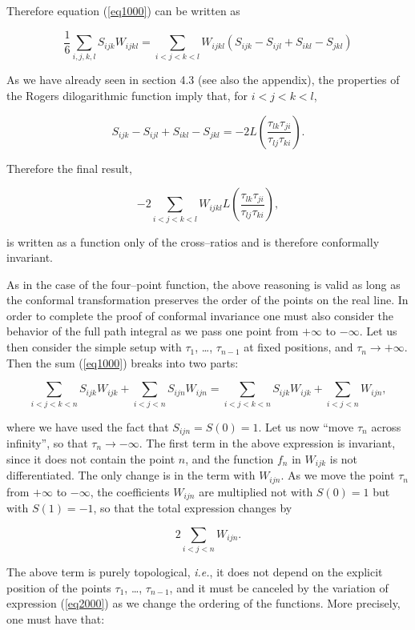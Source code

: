 \documentclass[a4paper,11pt]{article}
\begin{document}
\noindent
Therefore equation (\ref{eq1000}) can be written as 

$$
\frac{1}{6}\sum_{i,j,k,l}S_{ijk}W_{ijkl}=\sum_{i<j<k<l}W_{ijkl}\left(
S_{ijk}-S_{ijl}+S_{ikl}-S_{jkl}\right)
$$

\noindent
As we have already seen in section 4.3 (see also the appendix), the 
properties of the Rogers dilogarithmic function imply that, for $i<j<k<l$, 

$$
S_{ijk}-S_{ijl}+S_{ikl}-S_{jkl}=-2L\left( \frac{\tau _{lk}\tau _{ji}}{\tau
_{lj}\tau _{ki}}\right) .
$$

\noindent
Therefore the final result,

\begin{equation}
-2\sum_{i<j<k<l}W_{ijkl}L\left( \frac{\tau _{lk}\tau _{ji}}{\tau _{lj}\tau
_{ki}}\right) ,
\end{equation}

\noindent
is written as a function only of the cross--ratios and is therefore
conformally invariant.

As in the case of the four--point function, the above reasoning is valid as
long as the conformal transformation preserves the order of the points on
the real line. In order to complete the proof of conformal invariance 
one must also consider the behavior of the full path integral as we pass
one point from $+\infty$ to $-\infty$. Let us then consider the simple
setup with $\tau_{1}$, \dots, $\tau_{n-1}$ at fixed positions, and $\tau
_{n}\rightarrow +\infty $. Then the sum (\ref{eq1000}) breaks into two 
parts:

$$
\sum_{i<j<k<n}S_{ijk}W_{ijk}+\sum_{i<j<n}S_{ijn}W_{ijn}=
\sum_{i<j<k<n}S_{ijk}W_{ijk}+\sum_{i<j<n}W_{ijn},
$$

\noindent
where we have used the fact that $S_{ijn}=S\left( 0\right) =1$. Let us now
``move $\tau_{n}$ across infinity'', so that $\tau _{n}\rightarrow -\infty 
$. The first term in the above expression is invariant, since it does not
contain the point $n$, and the function $f_{n}$ in $W_{ijk}$ is not
differentiated. The only change is in the term with $W_{ijn}$. As we move
the point $\tau _{n}$ from $+\infty $ to $-\infty $, the coefficients 
$W_{ijn}$ are multiplied not with $S\left( 0\right) =1$ but with $S\left(
1\right) =-1$, so that the total expression changes by

$$
2\sum_{i<j<n}W_{ijn}.
$$

\noindent
The above term is purely topological, \textit{i.e.}, it does not depend 
on the explicit position of the points $\tau_{1}$, \dots, $\tau_{n-1}$, 
and it must be canceled by the variation of expression (\ref{eq2000}) as we 
change the ordering of the functions. More precisely, one must have that:
\end{document}
